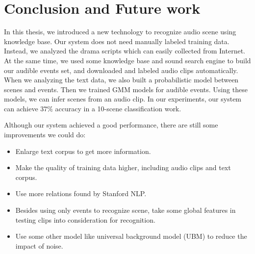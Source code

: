 \chapter{Conclusion and Future work}
In this thesis, we introduced a new technology to recognize audio scene using knowledge base. Our system does not need manually labeled training data. Instead, we analyzed the drama scripts which can easily collected from Internet. At the same time, we used some knowledge base and sound search engine to build our audible events set, and downloaded and labeled audio clips automatically. When we analyzing the text data, we also built a probabilistic model between scenes and events. Then we trained GMM models for audible events. Using these models, we can infer scenes from an audio clip. In our experiments, our system can achieve $37\%$ accuracy in a 10-scene classification work.

Although our system achieved a good performance, there are still some improvements we could do:

\begin{itemize}
\item Enlarge text corpus to get more information.
\item Make the quality of training data higher, including audio clips and text corpus.
\item Use more relations found by Stanford NLP.
\item Besides using only events to recognize scene, take some global features in testing clips into consideration for recognition.
\item Use some other model like universal background model (UBM) to reduce the impact of noise.
\end{itemize}


